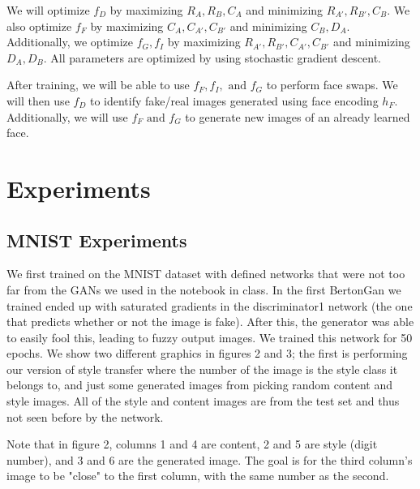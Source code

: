 \documentclass{article}
\begin{document}
We will optimize $f_D$ by maximizing $R_A, R_B, C_A$ and minimizing $R_{A'}, R_{B'}, C_B$. We also optimize $f_F$ by maximizing $C_A, C_{A'}, C_{B'}$ and minimizing $C_B, D_A$.
Additionally, we optimize $f_G, f_I$ by maximizing $R_{A'}, R_{B'}, C_{A'}, C_{B'}$ and
minimizing $D_A, D_B$. All parameters are optimized by using stochastic gradient descent.

After training, we will be able to use $f_F, f_I, \text{ and } f_G$ to perform face swaps. We will then use $f_D$ to identify fake/real images generated using face encoding $h_F$. Additionally, we will use $f_F \text{ and } f_G$ to generate new images of an already learned face.

\section{Experiments}

\subsection{MNIST Experiments}

We first trained on the MNIST dataset with defined networks that were not too far from the GANs we used in the notebook in class.
In the first BertonGan we trained ended up with saturated gradients in the discriminator1 network
(the one that predicts whether or not the image is fake).
After this, the generator was able to easily fool this, leading to fuzzy output images.
We trained this network for 50 epochs.
We show two different graphics in figures 2 and 3; the first is performing our version of style transfer
where the number of the image is the style class it belongs to,
and just some generated images from picking random content and style images.
All of the style and content images are from the test set and thus not seen before by the network.

Note that in figure 2, columns 1 and 4 are content, 2 and 5 are style (digit number), and 3 and 6 are the generated image.
The goal is for the third column's image to be "close" to the first column, with the same number as the second.
\end{document}

